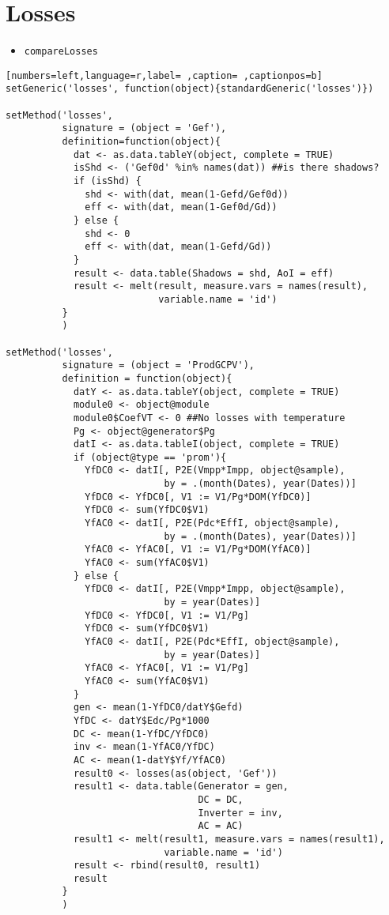 \section{Losses}
\label{sec:org9341225}
\begin{itemize}
\item \texttt{compareLosses}
\end{itemize}
\begin{lstlisting}[numbers=left,language=r,label= ,caption= ,captionpos=b]
setGeneric('losses', function(object){standardGeneric('losses')})

setMethod('losses',
          signature = (object = 'Gef'),
          definition=function(object){
            dat <- as.data.tableY(object, complete = TRUE)
            isShd <- ('Gef0d' %in% names(dat)) ##is there shadows?
            if (isShd) {
              shd <- with(dat, mean(1-Gefd/Gef0d))
              eff <- with(dat, mean(1-Gef0d/Gd))
            } else {
              shd <- 0
              eff <- with(dat, mean(1-Gefd/Gd))
            }
            result <- data.table(Shadows = shd, AoI = eff)
            result <- melt(result, measure.vars = names(result),
                           variable.name = 'id')
          }
          )

setMethod('losses',
          signature = (object = 'ProdGCPV'),
          definition = function(object){
            datY <- as.data.tableY(object, complete = TRUE)
            module0 <- object@module
            module0$CoefVT <- 0 ##No losses with temperature
            Pg <- object@generator$Pg
            datI <- as.data.tableI(object, complete = TRUE)
            if (object@type == 'prom'){
              YfDC0 <- datI[, P2E(Vmpp*Impp, object@sample),
                            by = .(month(Dates), year(Dates))]
              YfDC0 <- YfDC0[, V1 := V1/Pg*DOM(YfDC0)]
              YfDC0 <- sum(YfDC0$V1)
              YfAC0 <- datI[, P2E(Pdc*EffI, object@sample),
                            by = .(month(Dates), year(Dates))]
              YfAC0 <- YfAC0[, V1 := V1/Pg*DOM(YfAC0)]
              YfAC0 <- sum(YfAC0$V1)
            } else {
              YfDC0 <- datI[, P2E(Vmpp*Impp, object@sample),
                            by = year(Dates)]
              YfDC0 <- YfDC0[, V1 := V1/Pg]
              YfDC0 <- sum(YfDC0$V1)
              YfAC0 <- datI[, P2E(Pdc*EffI, object@sample),
                            by = year(Dates)]
              YfAC0 <- YfAC0[, V1 := V1/Pg]
              YfAC0 <- sum(YfAC0$V1)
            }
            gen <- mean(1-YfDC0/datY$Gefd)
            YfDC <- datY$Edc/Pg*1000
            DC <- mean(1-YfDC/YfDC0)
            inv <- mean(1-YfAC0/YfDC)
            AC <- mean(1-datY$Yf/YfAC0)
            result0 <- losses(as(object, 'Gef'))
            result1 <- data.table(Generator = gen,
                                  DC = DC,
                                  Inverter = inv,
                                  AC = AC)
            result1 <- melt(result1, measure.vars = names(result1),
                            variable.name = 'id')
            result <- rbind(result0, result1)
            result
          }
          )

\end{lstlisting}
